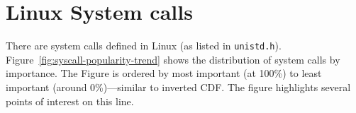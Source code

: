 \section{Linux System calls}
\label{sec:study:syscall}


There are \syscallnum{} system calls defined in \osarch{} Linux  (as listed in {\tt unistd.h}). 
Figure~\ref{fig:syscall-popularity-trend} shows the 
distribution of system calls by importance.
The Figure is ordered by most important (at 100\%) to least important (around 0\%)---similar
to inverted CDF.
The figure highlights several points of interest on this line.

